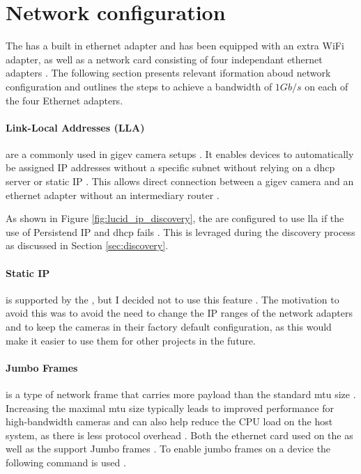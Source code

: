 \section{Network configuration}
\label{sec:network_configuration}
The \jx has a built in ethernet adapter and has been equipped with an extra WiFi adapter, as well as a network card consisting of four independant ethernet adapters \cite[Section 6.5]{martensPortableSensorRig2022}.
The following section presents relevant iformation aboud network configuration and outlines the steps to achieve a bandwidth of $1Gb/s$ on each of the four Ethernet adapters.

\paragraph{Link-Local Addresses (LLA)} are a commonly used in \gls{gigev} camera setups \cite{teledyneSettingIPAddress01} \cite{lucidvisionlabsArenaSoftwareDevelopment2020}.
It enables devices to automatically be assigned IP addresses without a specific subnet without relying on a \gls{dhcp} server or static IP \cite{annieahujaweb2020LinkLocalAddress2022}.
This allows direct connection between a \gls{gigev} camera and an ethernet adapter without an intermediary router \cite{annieahujaweb2020LinkLocalAddress2022}.

As shown in Figure \ref{fig:lucid_ip_discovery}, the \cams are configured to use \gls{lla} if the use of Persistend IP and \gls{dhcp} fails \cite{lucidvisionlabsArenaSoftwareDevelopment2020}.
This is levraged during the discovery process as discussed in Section \ref{sec:discovery}.

\paragraph{Static IP} is supported by the \cams, but I decided not to use this feature \cite{lucidvisionlabsArenaSoftwareDevelopment2020}.
The motivation to avoid this was to avoid the need to change the IP ranges of the network adapters and to keep the cameras in their factory default configuration, as this would make it easier to use them for other projects in the future.

\paragraph{Jumbo Frames} is a type of network frame that carries more payload than the standard \gls{mtu} size \cite{ieeeIEEEStandardsInterpretation2002} \cite{lucidvisionlabsJumboFramesLUCID2020}.
Increasing the maximal \gls{mtu} size typically leads to improved performance for high-bandwidth cameras and can also help reduce the CPU load on the host system, as there is less protocol overhead \cite{lucidvisionlabsJumboFramesLUCID2020} \cite{lukeThingsYouShould2018}.
Both the ethernet card used on the \jx as well as the \cams support Jumbo frames \cite{IntelI350am4Chip} \cite{lucidvisionlabsTritonMPPolarized2020}.
To enable jumbo frames on a device the following command is used .

